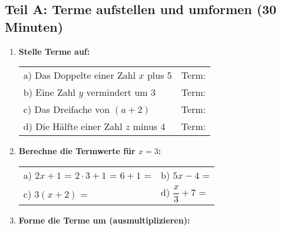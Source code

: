 \subsection*{Teil A: Terme aufstellen und umformen (30 Minuten)}

\begin{enumerate}[label=\arabic*.]

    \item \textbf{Stelle Terme auf:}
    \vspace{0.5cm}

    \begin{tabular}{p{8cm}p{6cm}}
        a) Das Doppelte einer Zahl $x$ plus 5 & Term: \underline{\hspace{3cm}} \\[2ex]
        b) Eine Zahl $y$ vermindert um 3 & Term: \underline{\hspace{3cm}} \\[2ex]
        c) Das Dreifache von $(a + 2)$ & Term: \underline{\hspace{3cm}} \\[2ex]
        d) Die Hälfte einer Zahl $z$ minus 4 & Term: \underline{\hspace{3cm}}
    \end{tabular}

    \vspace{1cm}

    \item \textbf{Berechne die Termwerte für $x = 3$:}
    \vspace{0.5cm}

    \begin{tabular}{ll}
        a) $2x + 1$ = $2 \cdot 3 + 1$ = $6 + 1$ = \underline{\hspace{2cm}} & b) $5x - 4$ = \underline{\hspace{4cm}} \\[3ex]
        c) $3(x + 2)$ = \underline{\hspace{4cm}} & d) $\dfrac{x}{3} + 7$ = \underline{\hspace{4cm}}
    \end{tabular}

    \vspace{1cm}

    \item \textbf{Forme die Terme um (ausmultiplizieren):}
    \vspace{0.5cm}


\end{enumerate}
